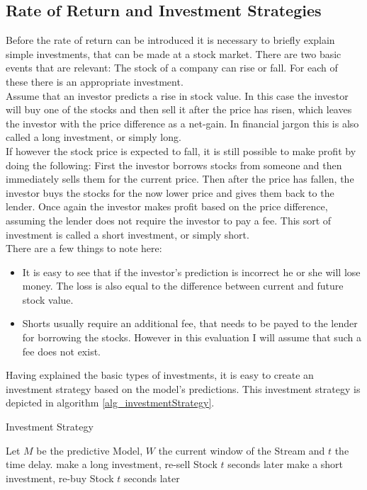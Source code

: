 \subsection{Rate of Return and Investment Strategies}
\label{subsec_investmentStrageties}
Before the rate of return can be introduced it is necessary to briefly explain simple investments, that can be made at a stock market. There are two basic events that are relevant: The stock of a company can rise or fall. For each of these there is an appropriate investment. \\
Assume that an investor predicts a rise in stock value. In this case the investor will buy one of the stocks and then sell it after the price has risen, which leaves the investor with the price difference as a net-gain. In financial jargon this is also called a long investment, or simply long. \\
If however the stock price is expected to fall, it is still possible to make profit by doing the following: First the investor borrows stocks from someone and then immediately sells them for the current price. Then after the price has fallen, the investor buys the stocks for the now lower price and gives them back to the lender. Once again the investor makes profit based on the price difference, assuming the lender does not require the investor to pay a fee. This sort of investment is called a short investment, or simply short. \\
There are a few things to note here:
\begin{itemize}
	\item It is easy to see that if the investor's prediction is incorrect he or she will lose money. The loss is also equal to the difference between current and future stock value.
	\item Shorts usually require an additional fee, that needs to be payed to the lender for borrowing the stocks. However in this evaluation I will assume that such a fee does not exist.
\end{itemize}

Having explained the basic types of investments, it is easy to create an investment strategy based on the model's predictions. This investment strategy is depicted in algorithm \ref{alg_investmentStrategy}. 

\begin{algorithm}[H]
  \caption{Investment Strategy
    \label{alg_investmentStrategy}}
  \begin{algorithmic}[1]
    \Statex
    \Require Let $M$ be the predictive Model, $W$ the current window of the Stream and $t$ the time delay.
      		\State make a long investment, re-sell Stock $t$ seconds later
			\State make a short investment, re-buy Stock $t$ seconds later
       	\EndIf
    \EndFunction
  \end{algorithmic}
\end{algorithm}

